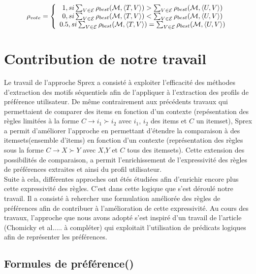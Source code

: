 \documentclass[a4paper,12pt,openany,oneside]{article}
\begin{document}
\[\rho_{vote}=
\left \{
\begin{array}{c c}
    1, si \sum_{V\in \mathcal{E}}\rho_{best}(\mathcal{M},\left<T,V\right>)>\sum_{V\in\mathcal{E}}\rho_{best}(\mathcal{M},\left<U,V\right>) \\
    0, si \sum_{V\in \mathcal{E}}\rho_{best}(\mathcal{M},\left<T,V\right>)<\sum_{V\in\mathcal{E}}\rho_{best}(\mathcal{M},\left<U,V\right>) \\
    0.5, si \sum_{V\in \mathcal{E}}\rho_{best}(\mathcal{M},\left<T,V\right>)=\sum_{V\in\mathcal{E}}\rho_{best}(\mathcal{M},\left<U,V\right>) \\
\end{array}
\right.
\]



\section{Contribution de notre travail}

Le travail de l'approche Sprex a consisté à exploiter l'efficacité des méthodes d'extraction des motifs séquentiels afin de l'appliquer à l'extraction des profils de préférence utilisateur. De même contrairement aux précédents travaux qui permettaient de comparer des items en fonction d'un contexte (repésentation des règles limitées à la forme $C\rightarrow i_1\succ i_2$ avec $i_1$, $i_2$ des items et $C$ un itemset), Sprex a permit d'améliorer l'approche en permettant d'étendre la comparaison à des itemsets(ensemble d'items) en fonction d'un contexte (représentation des règles sous la forme $C\rightarrow X\succ Y$ avec $X$,$Y$ et $C$ tous des itemsets). Cette extension des possibilités de comparaison, a permit l'enrichissement de l'expressivité des règles de préférences extraites et ainsi du profil utilisateur.\\
 
Suite à cela, différentes approches ont étés étudiées afin d'enrichir encore plus cette expressivité des règles. C'est dans cette logique que s'est déroulé notre travail. Il a consisté à rehercher une formulation améliorée des règles de préférences afin de contribuer à l'amélioration de cette expressivité. 
Au cours des travaux, l'approche que nous avons adopté s'est inspiré d'un travail de l'article (Chomicky et al..... à compléter) qui exploitait l'utilisation de prédicats logiques afin de représenter les préférences.



\subsection{Formules de préférence(\cite{CHO})}
\end{document}
